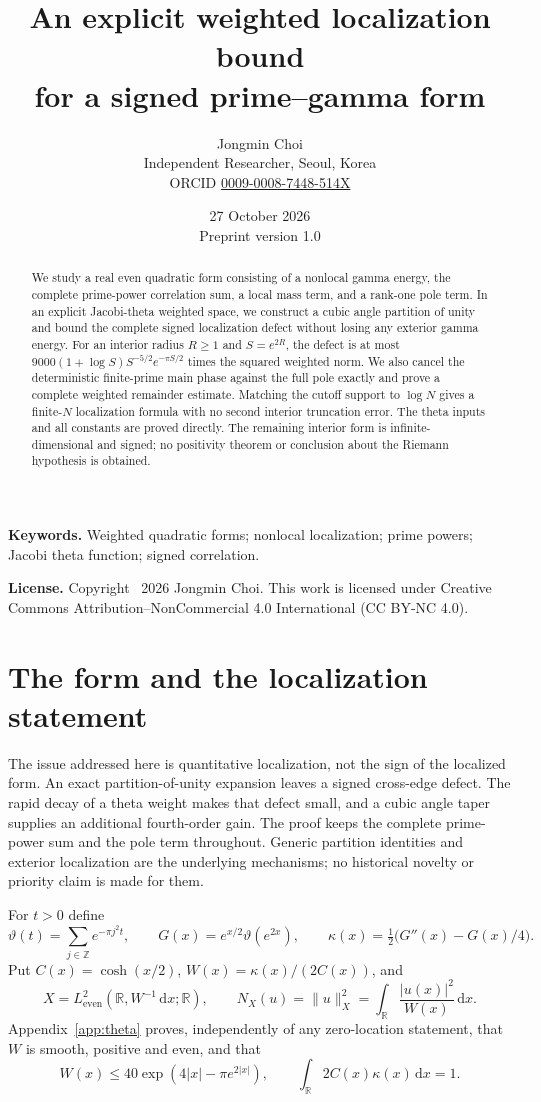 \documentclass[11pt]{article}
\title{An explicit weighted localization bound\\for a signed prime--gamma form}
\author{Jongmin Choi\\[3pt]\small Independent Researcher, Seoul, Korea\\\small ORCID \href{https://orcid.org/0009-0008-7448-514X}{0009-0008-7448-514X}}
\date{27 October 2026\\\small Preprint version 1.0}
\theoremstyle{remark}\newtheorem{remark}[theorem]{Remark}
\newcommand{\R}{\mathbb R}
\newcommand{\dd}{\,\mathrm d}
\newcommand{\norm}[1]{\lVert#1\rVert}
\numberwithin{equation}{section}
\begin{document}
\maketitle
\begin{abstract}
We study a real even quadratic form consisting of a nonlocal gamma energy,
the complete prime-power correlation sum, a local mass term, and a rank-one
pole term. In an explicit Jacobi-theta weighted space, we construct a cubic
angle partition of unity and bound the complete signed localization defect
without losing any exterior gamma energy. For an interior radius $R\ge1$
and $S=e^{2R}$, the defect is at most
$9000(1+\log S)S^{-5/2}e^{-\pi S/2}$ times the squared weighted norm.
We also cancel the deterministic finite-prime main phase against the full
pole exactly and prove a complete weighted remainder estimate. Matching
the cutoff support to $\log N$ gives a finite-$N$ localization formula with
no second interior truncation error. The theta inputs and all constants are
proved directly. The remaining interior form is infinite-dimensional and
signed; no positivity theorem or conclusion about the Riemann hypothesis
is obtained.
\end{abstract}
\begingroup\small
\noindent\textbf{Keywords.} Weighted quadratic forms; nonlocal localization;
prime powers; Jacobi theta function; signed correlation.\par
\noindent\textbf{License.} Copyright \textcopyright\ 2026 Jongmin Choi.
This work is licensed under Creative Commons Attribution--NonCommercial
4.0 International (CC BY-NC 4.0).\par
\endgroup

\section{The form and the localization statement}

The issue addressed here is quantitative localization, not the sign of the
localized form. An exact partition-of-unity expansion leaves a signed
cross-edge defect. The rapid decay of a theta weight makes that defect
small, and a cubic angle taper supplies an additional fourth-order gain.
The proof keeps the complete prime-power sum and the pole term throughout.
Generic partition identities and exterior localization are the underlying
mechanisms; no historical novelty or priority claim is made for them.

For $t>0$ define
\[
 \vartheta(t)=\sum_{j\in\mathbb Z}e^{-\pi j^2t},\qquad
 G(x)=e^{x/2}\vartheta(e^{2x}),\qquad
 \kappa(x)=\tfrac12\bigl(G''(x)-G(x)/4\bigr).
\]
Put $C(x)=\cosh(x/2)$, $W(x)=\kappa(x)/(2C(x))$, and
\begin{equation}\label{eq:X}
 X=L^2_{\mathrm{even}}(\R,W^{-1}\dd x;\R),\qquad
 N_X(u)=\norm{u}_X^2=\int_\R\frac{|u(x)|^2}{W(x)}\dd x.
\end{equation}
Appendix~\ref{app:theta} proves, independently of any zero-location
statement, that $W$ is smooth, positive and even, and that
\begin{equation}\label{eq:theta-inputs}
 W(x)\le40\exp(4|x|-\pi e^{2|x|}),\qquad
 \int_\R2C(x)\kappa(x)\dd x=1.
\end{equation}
\end{document}
